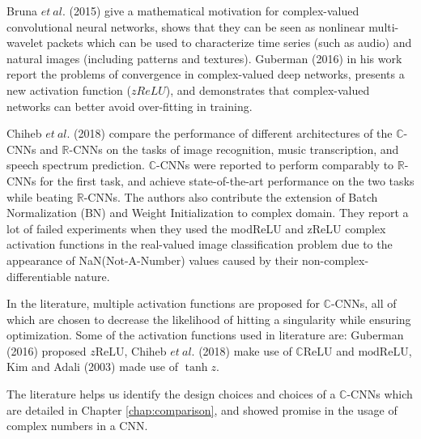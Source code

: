 Bruna $et \ al.$ (2015) \cite{bruna2015theoretical} give a mathematical motivation for complex-valued convolutional neural networks, shows that they can be seen as nonlinear multi-wavelet packets which can be used to characterize time series (such as audio) and natural images (including patterns and textures). Guberman (2016) \cite{Guberman} in his work report the problems of convergence in complex-valued deep networks, presents a new activation function ($zReLU$), and demonstrates that complex-valued networks can better avoid over-fitting in training. 

Chiheb $et \ al.$ (2018) \cite{trabelsi2018deep} compare the performance of different architectures of the $\mathbb{C}$-CNNs and $\mathbb{R}$-CNNs on the tasks of image recognition, music transcription, and speech spectrum prediction. $\mathbb{C}$-CNNs were reported to perform comparably to $\mathbb{R}$-CNNs for the first task, and achieve state-of-the-art performance on the two tasks while beating $\mathbb{R}$-CNNs. The authors also contribute the extension of Batch Normalization (BN) and Weight Initialization to complex domain. They report a lot of failed experiments when they used the modReLU and zReLU complex activation functions in the real-valued image classification problem due to the appearance of NaN(Not-A-Number) values caused by their non-complex-differentiable nature. 

In the literature, multiple activation functions are proposed for $\mathbb{C}$-CNNs, all of which are chosen to decrease the likelihood of hitting a singularity while ensuring optimization. Some of the activation functions used in literature are: Guberman (2016) proposed $z\mathrm{ReLU}$, Chiheb $et \ al.$ (2018) make use of $\mathbb{C}\mathrm{ReLU}$ and $\mathrm{modReLU}$, Kim and Adali (2003) \cite{kim2003approximation} made use of $\tanh{z}$.

The literature helps us identify the design choices and choices of a $\mathbb{C}$-CNNs which are detailed in Chapter \ref{chap:comparison}, and showed promise in the usage of complex numbers in a CNN. 



  
